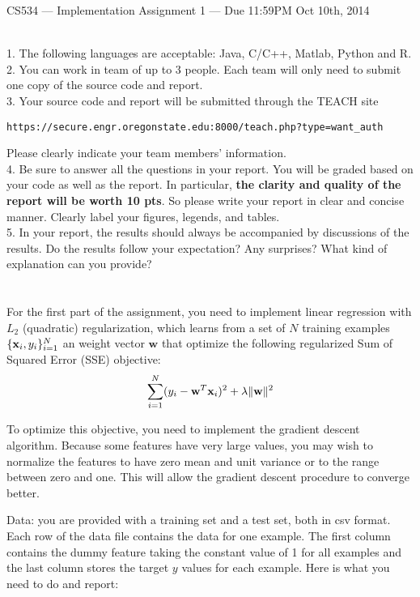 \documentclass{article}
\def\x{{\bf x}}
\def\w{{\bf w}}
\begin{document}
{\Large
\begin{center}
CS534 --- Implementation Assignment 1 --- {Due 11:59PM Oct 10th, 2014}
\end{center}
}

\\
1. The following languages are acceptable: Java, C/C++, Matlab, Python and R. \\
2. You can work in team of up to 3 people. Each team will only need to submit one copy of the source code and report.\\
3. Your source code and report will be submitted through the TEACH site
\begin{verbatim}https://secure.engr.oregonstate.edu:8000/teach.php?type=want_auth\end{verbatim}
Please clearly indicate your team members' information. \\
4. Be sure to answer all the questions in your report. You will be graded based on your code as well as the report. In particular, \textbf{the clarity and quality of the report will be worth 10 pts}. So please write your report in clear and concise manner. Clearly label your figures, legends, and tables.\\
5. In your report, the results should always be accompanied by discussions of the results. Do the results follow your expectation? Any surprises? What kind of explanation can you provide? \\
\\
\\
For the first part of the assignment, you need to implement linear regression with $L_2$ (quadratic) regularization, which learns from a set of $N$ training examples $\{\x_i, y_i\}_{i=1}^N$ an weight vector $\mathbf{w}$ that optimize the following regularized Sum of Squared Error (SSE) objective:
\begin{equation}
\label{eq1}
\sum_{i=1}^N (y_i-\mathbf{w}^T{\x_i})^2 +\lambda \| \w \| ^2
\end{equation}

To optimize this objective, you need to implement the gradient descent algorithm. Because some features have very large values, you may wish to normalize the features to have zero mean and unit variance or to the range between zero and one. This will allow the gradient descent procedure to converge better.

Data: you are provided with a training set and a test set, both in csv format. Each row of the data file contains the data for one example. The first column contains the dummy feature taking the constant value of 1 for all examples and the last column stores the target $y$ values for each example. Here is what you need to do and report:\\
\end{document}

